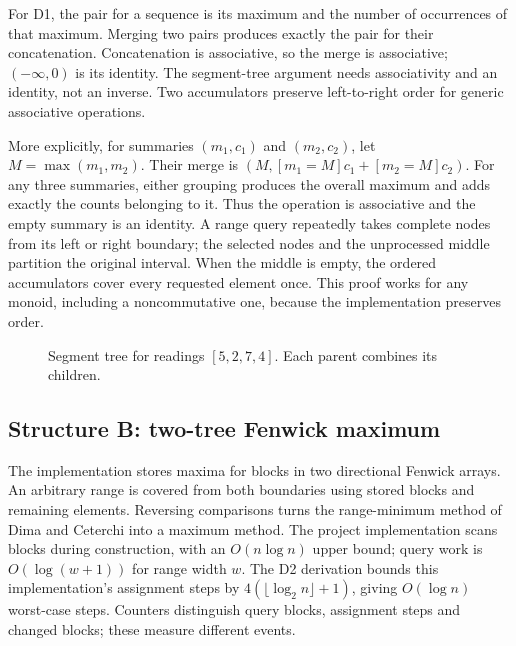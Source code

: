 \documentclass[11pt,a4paper]{article}
\begin{document}
For D1, the pair for a sequence is its maximum and the number of occurrences of that maximum. Merging two pairs produces exactly the pair for their concatenation. Concatenation is associative, so the merge is associative; $(-\infty,0)$ is its identity. The segment-tree argument needs associativity and an identity, not an inverse. Two accumulators preserve left-to-right order for generic associative operations.

More explicitly, for summaries $(m_1,c_1)$ and $(m_2,c_2)$, let $M=\max(m_1,m_2)$. Their merge is $(M,[m_1=M]c_1+[m_2=M]c_2)$. For any three summaries, either grouping produces the overall maximum and adds exactly the counts belonging to it. Thus the operation is associative and the empty summary is an identity. A range query repeatedly takes complete nodes from its left or right boundary; the selected nodes and the unprocessed middle partition the original interval. When the middle is empty, the ordered accumulators cover every requested element once. This proof works for any monoid, including a noncommutative one, because the implementation preserves order.
\begin{figure}[ht]
\centering
{}
\caption{Segment tree for readings $[5,2,7,4]$. Each parent combines its children.}
\end{figure}
\subsection{Structure B: two-tree Fenwick maximum}
The implementation stores maxima for blocks in two directional Fenwick arrays. An arbitrary range is covered from both boundaries using stored blocks and remaining elements. Reversing comparisons turns the range-minimum method of Dima and Ceterchi into a maximum method. The project implementation scans blocks during construction, with an $O(n\log n)$ upper bound; query work is $O(\log(w+1))$ for range width $w$. The D2 derivation bounds this implementation's assignment steps by $4(\lfloor\log_2 n\rfloor+1)$, giving $O(\log n)$ worst-case steps. Counters distinguish query blocks, assignment steps and changed blocks; these measure different events.
\end{document}
